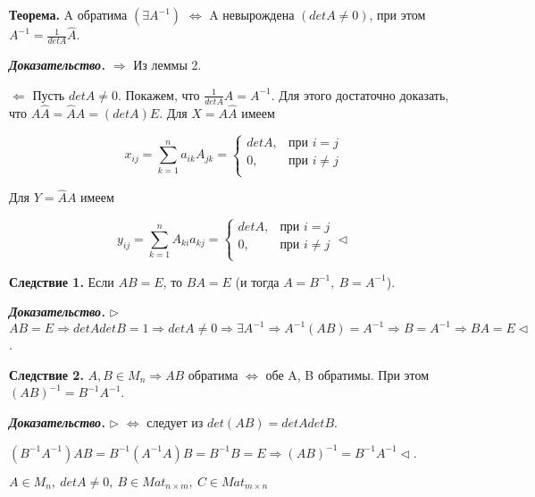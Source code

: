 \vspace{\baselineskip}
\textbf{Теорема.} A обратима $(\exists A^{-1})$ $\Leftrightarrow$ A невырождена $(detA \neq 0)$, при этом $A^{-1} = \frac{1}{detA} \widehat{A}$.

\vspace{\baselineskip}
\textbf{\textit{Доказательство.}} $\Rightarrow$ Из леммы 2.

$\Leftarrow$ Пусть $detA \neq 0$. Покажем, что $\frac{1}{detA} \widehat{A} = A^{-1}$. Для этого достаточно доказать, что $A \widehat{A} = \widehat{A} A = (detA) E$. Для $X = A \widehat{A}$ имеем

\[
	x_{ij} = \sum\limits_{k = 1}^n a_{ik} A_{jk} = \begin{cases}
		detA, &\text{при }  i = j  \\
		0, &\text{при } i \neq j \\
	\end{cases}
\]

\vspace{\baselineskip}
Для $Y = \widehat{A} A$ имеем 

\[
	y_{ij} = \sum\limits_{k = 1}^n A_{ki} a_{kj} = \begin{cases}
		detA, &\text{при }  i = j  \\
		0, &\text{при } i \neq j \\
	\end{cases} \lhd
\]

\vspace{\baselineskip}
\textbf{Следствие 1.} Если $AB = E$, то $BA = E$ (и тогда $A = B^{-1}, \ B = A^{-1}$).

\vspace{\baselineskip}
\textbf{\textit{Доказательство.}} $\rhd$ $AB = E \Rightarrow detA detB = 1 \Rightarrow detA \neq 0 \Rightarrow \exists A^{-1} \Rightarrow A^{-1}(AB) = A^{-1} \Rightarrow B = A^{-1} \Rightarrow BA = E \lhd$.

\vspace{\baselineskip}
\textbf{Следствие 2.} $A, B \in M_n \Rightarrow AB$ обратима $\Leftrightarrow$ обе A, B обратимы. При этом $(AB)^{-1} = B^{-1} A^{-1}$.

\vspace{\baselineskip}
\textbf{\textit{Доказательство.}} $\rhd$ $\Leftrightarrow$ следует из $det(AB) = detA detB$.

$(B^{-1} A^{-1})AB = B^{-1} (A^{-1} A) B = B^{-1} B = E \Rightarrow (AB)^{-1} = B^{-1} A^{-1} \lhd$.

\vspace{\baselineskip}
$A \in M_n, \ detA \neq 0, \ B \in Mat_{n \times m}, \ C \in Mat_{m \times n}$

